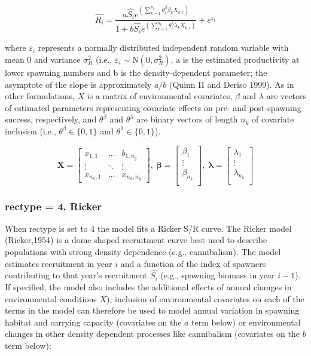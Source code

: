 \documentclass[
]{article}
\begin{document}
\[\hat{R_i}=\frac{ a \hat{S_i}e^{ \left( \sum_{k=1}^{n_k}{\theta_i^{\beta}\beta_k X_{k,i}} \right)}}{ 1+b\hat{S_i}e^{\left( \sum_{k=1}^{n_k}{\theta_i^{\lambda}\lambda_k X_{k,i}} \right) }}+e^{\varepsilon_i}\]

where \(\varepsilon_i\) represents a normally distributed independent
random variable with mean 0 and variance \(\sigma^2_R\) (i.e.,
\(\varepsilon_i\sim \mathrm N(0,\sigma^2_R)\), \(\mathrm a\) is the
estimated productivity at lower spawning numbers and b is the
density-dependent parameter; the asymptote of the slope is approximately
\(a/b\) (Quinn II and Deriso 1999). As in other formulations, \({X}\) is
a matrix of environmental covariates, \(\beta\) and \(\lambda\) are
vectors of estimated parameters representing covariate effects on pre-
and post-spawning success, respectively, and \(\theta^{\beta}\) and
\(\theta^{\lambda}\) are binary vectors of length \(n_k\) of covariate
inclusion (i.e., \({\theta^{\beta}} \in \{0,1 \}\) and
\({\theta^{\lambda}} \in \{0,1 \}\)).

\[\mathbf{X} = \left[\begin{array}
{rrr}
x_{1,1} & \dots  & b_{1,n_y} \\
\vdots & \ddots & \vdots \\
x_{n_k,1} & \dots  & x_{n_k,n_y}
\end{array}\right],\;
\mathbf{\beta} = \left[\begin{array}
{rrr}
\beta_1 \\
\vdots  \\
\beta_{n_k} \\
\end{array}\right],\;
\mathbf{\lambda} = \left[\begin{array}
{rrr}
\lambda_1 \\
\vdots  \\
\lambda_{n_k}\\
\end{array}\right]
\]

\hypertarget{rectype-4.-ricker}{%
\subsubsection{rectype = 4. Ricker}\label{rectype-4.-ricker}}

When rectype is set to 4 the model fits a Ricker S/R curve. The Ricker
model (Ricker,1954) is a dome shaped recruitment curve best used to
describe populations with strong density dependence (e.g., cannibalism).
The model estimates recruitment in year \(i\) and a function of the
index of spawners contributing to that year's recruitment \(\hat{S_i}\)
(e.g., spawning biomass in year \(i-1\)). If specified, the model also
includes the additional effects of annual changes in environmental
conditions \({X}\)); inclusion of environmental covariates on each of
the terms in the model can therefore be used to model annual variation
in spawning habitat and carrying capacity (covariates on the \(a\) term
below) or environmental changes in other density dependent processes
like cannibalism (covariates on the \(b\) term below):
\end{document}
